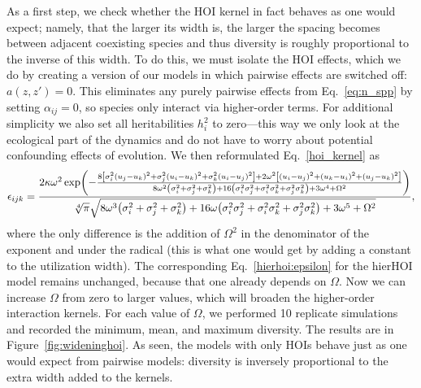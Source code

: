 \documentclass[10pt]{article}
\let\originalleft\left
\let\originalright\right
\renewcommand{\left}{\mathopen{}\mathclose\bgroup\originalleft}
\renewcommand{\right}{\aftergroup\egroup\originalright}
\begin{document}
As a first step, we check whether the HOI kernel in fact behaves as one would expect; namely, that the larger its width is, the larger the spacing becomes between adjacent coexisting species and thus diversity is roughly proportional to the inverse of this width. To do this, we must isolate the HOI effects, which we do by creating a version of our models in which pairwise effects are switched off: $a(z,z') = 0$. This eliminates any purely pairwise effects from Eq.~\ref{eq:n_spp} by setting $\alpha_{ij} = 0$, so species only interact via higher-order terms. For additional simplicity we also set all heritabilities $h_i^2$ to zero---this way we only look at the ecological part of the dynamics and do not have to worry about potential confounding effects of evolution. We then reformulated Eq.~\ref{hoi_kernel} as
\begin{equation}
  \label{eq:hoi_kernel_widen}
  \epsilon_{ijk} = \frac{2 \kappa \omega^2 \exp \left(-\frac{8 \left[\sigma_i^2 (u_j-u_k)^2 + \sigma_j^2 (u_i-u_k)^2 + \sigma_k^2 (u_i-u_j)^2 \right] + 2 \omega^2 \left[(u_i-u_j)^2+(u_k-u_i)^2+(u_j-u_k)^2\right]}{8 \omega^2 \left(\sigma_i^2+\sigma_j^2+\sigma_k^2\right)+16 \left(\sigma_i^2\sigma_j^2+\sigma_i^2\sigma_k^2+\sigma_j^2 \sigma_k^2\right)+3 \omega^4 + \Omega^2}\right)}{\sqrt[4]{\pi} \sqrt{8 \omega ^3 \left(\sigma_i^2+\sigma_j^2+\sigma_k^2\right)+16 \omega  \left(\sigma_i^2\sigma_j^2+\sigma_i^2\sigma_k^2+\sigma_j^2 \sigma_k^2\right)+3 \omega^5 + \Omega^2}} ,
\end{equation}
where the only difference is the addition of $\Omega^2$ in the denominator of the exponent and under the radical (this is what one would get by adding a constant to the utilization width). The corresponding Eq.~\ref{hierhoi:epsilon} for the hierHOI model remains unchanged, because that one already depends on $\Omega$. Now we can increase $\Omega$ from zero to larger values, which will broaden the higher-order interaction kernels. For each value of $\Omega$, we performed 10 replicate simulations and recorded the minimum, mean, and maximum diversity. The results are in Figure~\ref{fig:wideninghoi}. As seen, the models with only HOIs behave just as one would expect from pairwise models: diversity is inversely proportional to the extra width added to the kernels.
\end{document}
